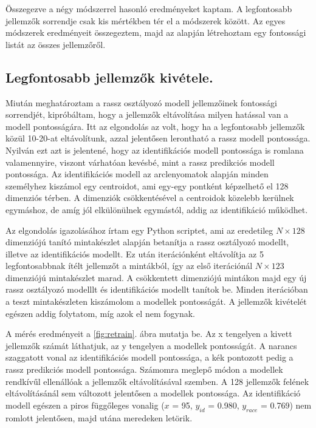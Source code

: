 Összegezve a négy módszerrel hasonló eredményeket kaptam. A legfontosabb jellemzők sorrendje csak kis mértékben tér el a módszerek között. Az egyes módszerek eredményeit összegeztem, majd az alapján létrehoztam egy fontossági listát az összes jellemzőről.

\subsection{Legfontosabb jellemzők kivétele.}

Miután meghatároztam a rassz osztályozó modell jellemzőinek fontossági sorrendjét, kipróbáltam, hogy a jellemzők eltávolítása milyen hatással van a modell pontosságára. Itt az elgondolás az volt, hogy ha a legfontosabb jellemzők közül 10-20-at eltávolítunk, azzal jelentősen lerontható a rassz modell pontossága. Nyilván ezt azt is jelentené, hogy az identifikációs modell pontossága is romlana valamennyire, viszont várhatóan kevésbé, mint a rassz predikciós modell pontossága. Az identifikációs modell az arclenyomatok alapján minden személyhez kiszámol egy centroidot, ami egy-egy pontként képzelhető el 128 dimenziós térben. A dimenziók csökkentésével a centroidok közelebb kerülnek egymáshoz, de amíg jól elkülönülnek egymástól, addig az identifikáció működhet.

Az elgondolás igazolásához írtam egy Python scriptet, ami az eredetileg $N \times 128$ dimenziójú tanító mintakészlet alapján betanítja a rassz osztályozó modellt, illetve az identifikációs modellt. Ez után iterációnként eltávolítja az 5 legfontosabbnak ítélt jellemzőt a mintákból, így az első iterációnál $N \times 123$ dimenziójú mintakészlet marad. A csökkentett dimenziójú mintákon majd egy új rassz osztályozó modelllt és identifikációs modellt tanítok be. Minden iterációban a teszt mintakészleten kiszámolom a modellek pontosságát. A jellemzők kivételét egészen addig folytatom, míg azok el nem fogynak. 

A mérés eredményeit a \ref{fig:retrain}. ábra mutatja be. Az x tengelyen a kivett jellemzők számát láthatjuk, az y tengelyen a modellek pontosságát. A narancs szaggatott vonal az identifikációs modell pontossága, a kék pontozott pedig a rassz predikciós modell pontossága. Számomra meglepő módon a modellek rendkívűl ellenállóak a jellemzők eltávolításával szemben. A 128 jellemzők felének eltávolításánál sem változott jelentősen a modellek pontossága. Az identifikáció modell egészen a piros függőleges vonalig ($x$ = 95, $y_{id}$ = 0.980, $y_{race}$ = 0.769) nem romlott jelentősen, majd utána meredeken letörik.

